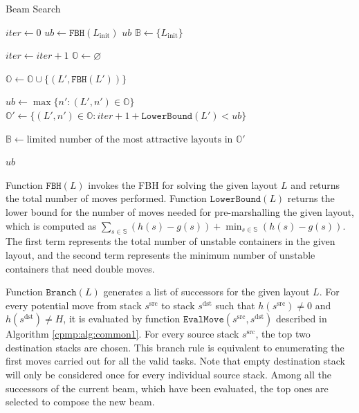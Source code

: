 \documentclass{article}
\newcommand{\mss}{s^\mathrm{src}}
\newcommand{\mds}{s^\mathrm{dst}}
\begin{document}
\begin{algorithm}[htbp]
\caption{Beam Search}
\label{cpmp:alg:bs}

{
  $\mathit{iter}\gets 0$\;
  $\mathit{ub}\gets \mathtt{FBH}(L_\mathrm{init})$\;
  {
    \Return $\mathit{ub}$\;
  }
  $\mathbb{B}\gets \{L_\mathrm{init}\}$\;
  {
    $\mathit{iter}\gets \mathit{iter}+1$\;
    $\mathbb{O}\gets \varnothing$\;
    {
      {
        $\mathbb{O}\gets \mathbb{O}\cup \{(L',\mathtt{FBH}(L'))\}$\;
        
      }
    }
    {
      $\mathit{ub}\gets\max\{n':(L',n')\in \mathbb{O}\}$\;
    }
    $\mathbb{O}'\gets \{(L',n')\in \mathbb{O}:\mathit{iter}+1+\mathtt{LowerBound}(L')<\mathit{ub}\}$\;
   
    $\mathbb{B}\gets \textrm{limited number of the most attractive layouts in $\mathbb{O}'$}$\;
    

  }
  \Return $\mathit{ub}$\;
}

\end{algorithm}

Function $\mathtt{FBH}(L)$ invokes the FBH for solving the given layout $L$ and returns the total number of moves performed. Function $\mathtt{LowerBound}(L)$ returns the lower bound for the number of moves needed for pre-marshalling the given layout, which is computed as  $\sum_{s\in\mathbb{S}} (h(s)-g(s))+\min_{s\in\mathbb{S}}(h(s)-g(s))$. The first term represents the total number of unstable containers in the given layout, and the second term represents the minimum number of unstable containers that need double moves.

Function $\mathtt{Branch}(L)$ generates a list of successors for the given layout $L$.
For every potential move from stack $\mss$ to stack $\mds$ such that $h(\mss)\neq 0$ and $h(\mds)\neq H$, it is evaluated by function $\mathtt{EvalMove}(\mss,\mds)$ described in Algorithm \ref{cpmp:alg:common1}. For every source stack $\mss$, the top two destination stacks are chosen. This branch rule is equivalent to enumerating the first moves carried out for all the valid tasks.
Note that empty destination stack will only be considered once for every individual source stack.
Among all the successors of the current beam, which have been evaluated, the top ones are selected to compose the new beam.
\end{document}
